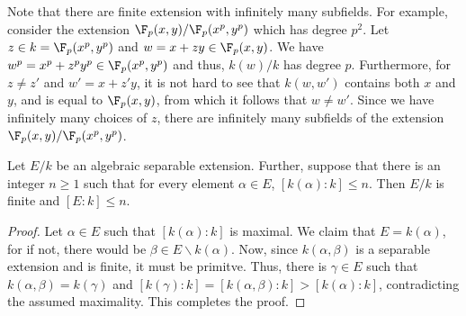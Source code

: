 Note that there are finite extension with infinitely many subfields. For example, consider the extension $\F_p(x,y)/\F_p(x^p,y^p)$ which has degree $p^2$. Let $z\in k=\F_p(x^p,y^p)$ and $w = x + zy\in\F_p(x,y)$. We have $w^p = x^p + z^py^p\in\F_p(x^p,y^p)$ and thus, $k(w)/k$ has degree $p$. Furthermore, for $z\ne z'$ and $w' = x + z'y$, it is not hard to see that $k(w,w')$ contains both $x$ and $y$, and is equal to $\F_p(x,y)$, from which it follows that $w\ne w'$. Since we have infinitely many choices of $z$, there are infinitely many subfields of the extension $\F_p(x,y)/\F_p(x^p,y^p)$.

\begin{lemma}
    Let $E/k$ be an algebraic separable extension. Further, suppose that there is an integer $n\ge 1$ such that for every element $\alpha\in E$, $[k(\alpha):k]\le n$. Then $E/k$ is finite and $[E:k]\le n$.
\end{lemma}
\begin{proof}
    Let $\alpha\in E$ such that $[k(\alpha):k]$ is maximal. We claim that $E = k(\alpha)$, for if not, there would be $\beta\in E\backslash k(\alpha)$. Now, since $k(\alpha,\beta)$ is a separable extension and is finite, it must be primitve. Thus, there is $\gamma\in E$ such that $k(\alpha,\beta) = k(\gamma)$ and $[k(\gamma):k] = [k(\alpha,\beta):k] > [k(\alpha):k]$, contradicting the assumed maximality. This completes the proof.
\end{proof}